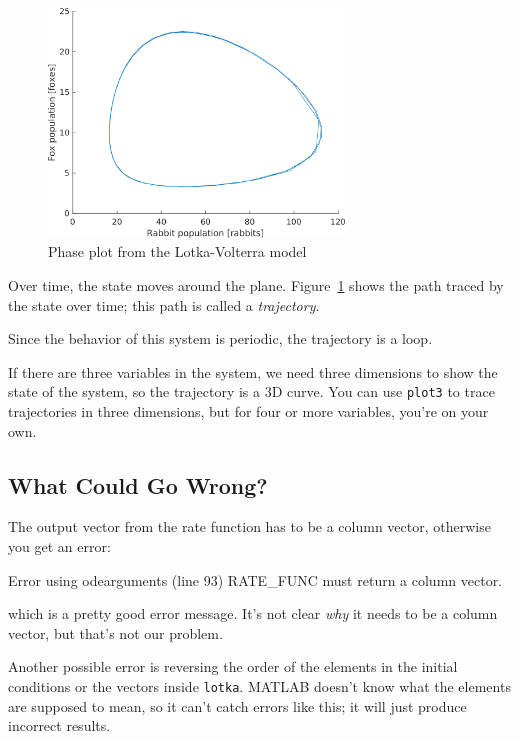\begin{figure}[ht]
\centerline{\includegraphics[width=0.7\textwidth]{../code/chap10/lotka_state.png}}
\caption{Phase plot from the Lotka-Volterra model}
\label{fig:phase}
\end{figure}


Over time, the state moves around the plane. Figure~\ref{fig:phase} shows
the path traced by the state over time; this path
is called a \emph{trajectory}.

Since the behavior of this system is periodic, the trajectory is a loop.

If there are three variables in the system, we need three dimensions to show
the state of the system, so the trajectory is a 3D curve.
You can use \lstinline{plot3} to trace trajectories in three dimensions,
but for four or more variables, you're on your own.



\subsection{What Could Go Wrong?}

The output vector from the rate function has to be a column vector, otherwise you get an error:

\begin{code}
Error using odearguments (line 93)
RATE_FUNC must return a column vector.
\end{code}
which is a pretty good error message.  It's not clear \emph{why}
it needs to be a column vector, but that's not our problem.


Another possible error is reversing the order of the elements in the
initial conditions or the vectors inside \lstinline{lotka}.  MATLAB
doesn't know what the elements are supposed to mean, so it can't catch
errors like this; it will just produce incorrect results.

